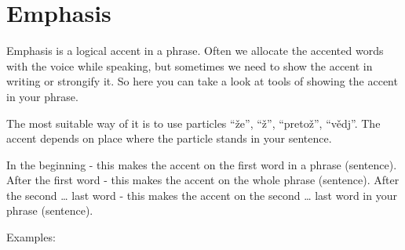 \section{Emphasis}

Emphasis is a logical accent in a phrase. Often we allocate the accented words with the voice while speaking, but sometimes we need to show the accent in writing or strongify it. So here you can take a look at tools of showing the accent in your phrase.

The most suitable way of it is to use particles “že”, “ž”, “pretož”, “vědj”. The accent depends on place where the particle stands in your sentence. 

In the beginning - this makes the accent on the first word in a phrase (sentence).
After the first word - this makes the accent on the whole phrase (sentence).
After the second … last word - this makes the accent on the second … last word in your phrase (sentence).

Examples:

